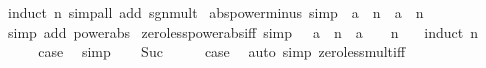 \begin{isabellebody}
%
\isatagproof
{}\isamarkupfalse%
\ {\isacharparenleft}{\kern0pt}induct\ n{\isacharparenright}{\kern0pt}\ {\isacharparenleft}{\kern0pt}simp{\isacharunderscore}{\kern0pt}all\ add{\isacharcolon}{\kern0pt}\ sgn{\isacharunderscore}{\kern0pt}mult{\isacharparenright}{\kern0pt}%
\endisatagproof
{\isafoldproof}%
%
\isadelimproof
\isanewline
%
\endisadelimproof
\isanewline
{}\isamarkupfalse%
\ abs{\isacharunderscore}{\kern0pt}power{\isacharunderscore}{\kern0pt}minus\ {\isacharbrackleft}{\kern0pt}simp{\isacharbrackright}{\kern0pt}{\isacharcolon}{\kern0pt}\ {\isachardoublequoteopen}{\isasymbar}{\isacharparenleft}{\kern0pt}{\isacharminus}{\kern0pt}\ a{\isacharparenright}{\kern0pt}\ {\isacharcircum}{\kern0pt}\ n{\isasymbar}\ {\isacharequal}{\kern0pt}\ {\isasymbar}a\ {\isacharcircum}{\kern0pt}\ n{\isasymbar}{\isachardoublequoteclose}\isanewline
%
\isadelimproof
\ \ %
\endisadelimproof
%
\isatagproof
{}\isamarkupfalse%
\ {\isacharparenleft}{\kern0pt}simp\ add{\isacharcolon}{\kern0pt}\ power{\isacharunderscore}{\kern0pt}abs{\isacharparenright}{\kern0pt}%
\endisatagproof
{\isafoldproof}%
%
\isadelimproof
\isanewline
%
\endisadelimproof
\isanewline
{}\isamarkupfalse%
\ zero{\isacharunderscore}{\kern0pt}less{\isacharunderscore}{\kern0pt}power{\isacharunderscore}{\kern0pt}abs{\isacharunderscore}{\kern0pt}iff\ {\isacharbrackleft}{\kern0pt}simp{\isacharbrackright}{\kern0pt}{\isacharcolon}{\kern0pt}\ {\isachardoublequoteopen}{}\ {\isacharless}{\kern0pt}\ {\isasymbar}a{\isasymbar}\ {\isacharcircum}{\kern0pt}\ n\ {\isasymlongleftrightarrow}\ a\ {\isasymnoteq}\ {}\ {\isasymor}\ n\ {\isacharequal}{\kern0pt}\ {}{\isachardoublequoteclose}\isanewline
%
\isadelimproof
%
\endisadelimproof
%
\isatagproof
{}\isamarkupfalse%
\ {\isacharparenleft}{\kern0pt}induct\ n{\isacharparenright}{\kern0pt}\isanewline
\ \ \isamarkupfalse%
\ {}\isanewline
\ \ \isamarkupfalse%
\ {\isacharquery}{\kern0pt}case\ \isamarkupfalse%
\ simp\isanewline
{}\isamarkupfalse%
\isanewline
\ \ \isamarkupfalse%
\ Suc\isanewline
\ \ \isamarkupfalse%
\ \isamarkupfalse%
\ {\isacharquery}{\kern0pt}case\ \isamarkupfalse%
\ {\isacharparenleft}{\kern0pt}auto\ simp{\isacharcolon}{\kern0pt}\ zero{\isacharunderscore}{\kern0pt}less{\isacharunderscore}{\kern0pt}mult{\isacharunderscore}{\kern0pt}iff{\isacharparenright}{\kern0pt}\isanewline
{}\isamarkupfalse%
%
\endisatagproof

\end{isabellebody}
